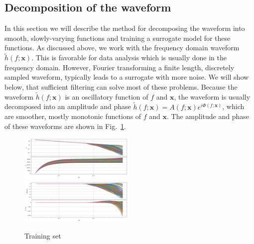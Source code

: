 \documentclass[prd,aps,letter,twocolumn,floatfix,notitlepage,nofootinbib]{revtex4-1}
\def\bx{\mathbf{x}}
\begin{document}
\subsection{Decomposition of the waveform}

In this section we will describe the method for decomposing the waveform into smooth, slowly-varying functions and training a surrogate model for these functions. As discussed above, we work with the frequency domain waveform $\tilde h(f; \bx)$. This is favorable for data analysis which is usually done in the frequency domain. However, Fourier transforming a finite length, discretely sampled waveform, typically leads to a surrogate with more noise. We will show below, that sufficient filtering can solve most of these problems. Because the waveform $\tilde h(f; \bx)$ is an oscillatory function of $f$ and $\bx$, the waveform is usually decomposed into an amplitude and phase $\tilde h(f; \bx) = A(f; \bx) e^{i\Phi(f; \bx)}$, which are smoother, mostly monotonic functions of $f$ and $\bx$. The amplitude and phase of these waveforms are shown in Fig.~\ref{fig:h}.

\begin{figure}[htb]
\centering
\includegraphics[width=0.49\textwidth]{h_trainingset.png}\\
\includegraphics[width=0.49\textwidth]{dh_trainingset.png}
\caption{Training set}
\label{fig:h}
\end{figure}
\end{document}
